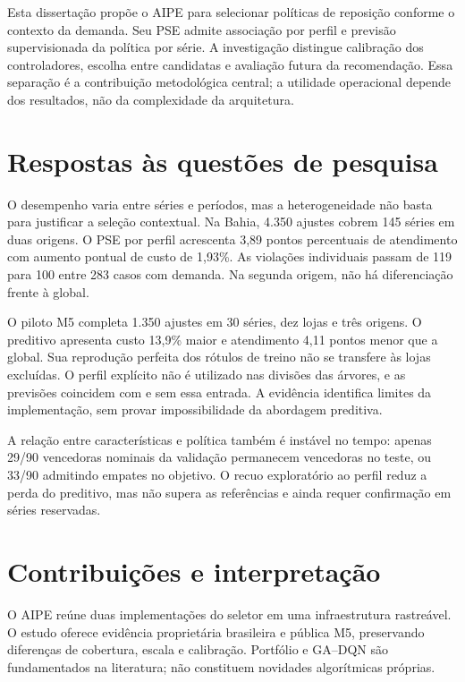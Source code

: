 
Esta dissertação propõe o AIPE para selecionar políticas de reposição conforme o contexto da demanda. Seu PSE admite associação por perfil e previsão supervisionada da política por série. A investigação distingue calibração dos controladores, escolha entre candidatas e avaliação futura da recomendação. Essa separação é a contribuição metodológica central; a utilidade operacional depende dos resultados, não da complexidade da arquitetura.

\section{Respostas às questões de pesquisa}
O desempenho varia entre séries e períodos, mas a heterogeneidade não basta para justificar a seleção contextual. Na Bahia, 4.350 ajustes cobrem 145 séries em duas origens. O PSE por perfil acrescenta 3,89 pontos percentuais de atendimento com aumento pontual de custo de 1,93\%. As violações individuais passam de 119 para 100 entre 283 casos com demanda. Na segunda origem, não há diferenciação frente à global.

O piloto M5 completa 1.350 ajustes em 30 séries, dez lojas e três origens. O preditivo apresenta custo 13,9\% maior e atendimento 4,11 pontos menor que a global. Sua reprodução perfeita dos rótulos de treino não se transfere às lojas excluídas. O perfil explícito não é utilizado nas divisões das árvores, e as previsões coincidem com e sem essa entrada. A evidência identifica limites da implementação, sem provar impossibilidade da abordagem preditiva.

A relação entre características e política também é instável no tempo: apenas 29/90 vencedoras nominais da validação permanecem vencedoras no teste, ou 33/90 admitindo empates no objetivo. O recuo exploratório ao perfil reduz a perda do preditivo, mas não supera as referências e ainda requer confirmação em séries reservadas.

\section{Contribuições e interpretação}
O AIPE reúne duas implementações do seletor em uma infraestrutura rastreável. O estudo oferece evidência proprietária brasileira e pública M5, preservando diferenças de cobertura, escala e calibração. Portfólio e GA--DQN são fundamentados na literatura; não constituem novidades algorítmicas próprias.


